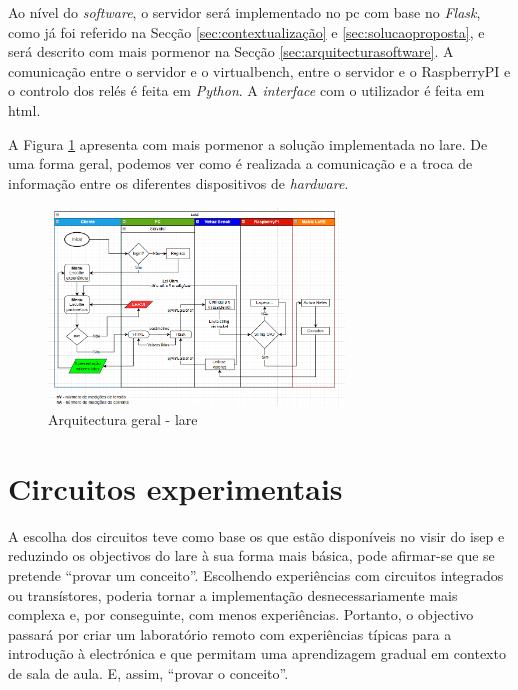 Ao nível do \textit{software}, o servidor será implementado no \acrshort{pc} com base no \textit{Flask}, como já foi referido na Secção \ref{sec:contextualização} e \ref{sec:solucaoproposta}, e será descrito com mais pormenor na Secção \ref{sec:arquitecturasoftware}. A comunicação entre o servidor e o \acrshort{virtualbench}, entre o servidor e o \gls{RaspberryPI} e o controlo dos relés é feita em \textit{Python}. A \textit{interface} com o utilizador é feita em \acrshort{html}.

A Figura {\ref{fig:arquitecturalore}} apresenta com mais pormenor a solução implementada no \acrshort{lare}. De uma forma geral, podemos ver como é realizada a comunicação e a troca de informação entre os diferentes dispositivos de \textit{hardware}.

\begin{figure}[hbtp]
    \centering
    \includegraphics[width=0.7\textwidth]{figures/arquitectura_geral_LaRE.png}
    \caption{Arquitectura geral - \acrshort{lare}}
    \label{fig:arquitecturalore}
\end{figure}

\section{Circuitos experimentais}
\label{sec:circuitos}
A escolha dos circuitos teve como base os que estão disponíveis no \acrshort{visir} do \acrshort{isep} e reduzindo os objectivos do \acrshort{lare} à sua forma mais básica, pode afirmar-se que se pretende ``provar um conceito''. Escolhendo experiências com circuitos integrados ou transístores, poderia tornar a implementação desnecessariamente mais complexa e, por conseguinte, com menos experiências. Portanto, o objectivo passará por criar um \acrshort{laboratório remoto} com experiências típicas para a introdução à electrónica e que permitam uma aprendizagem gradual em contexto de sala de aula. E, assim, ``provar o conceito''.

